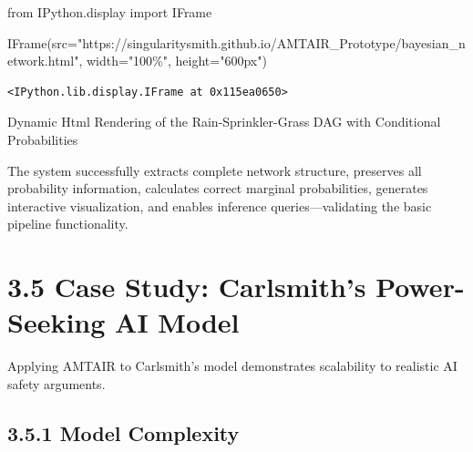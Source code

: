 \documentclass[
  11pt,
  letterpaper,
]{book}
\newenvironment{Shaded}{\begin{snugshade}}{\end{snugshade}}
\newcommand{\ImportTok}[1]{\textcolor[rgb]{0.00,0.46,0.62}{#1}}
\newcommand{\NormalTok}[1]{\textcolor[rgb]{0.00,0.23,0.31}{#1}}
\newcommand{\OperatorTok}[1]{\textcolor[rgb]{0.37,0.37,0.37}{#1}}
\newcommand{\StringTok}[1]{\textcolor[rgb]{0.13,0.47,0.30}{#1}}
\begin{document}
\begin{Shaded}
\begin{Highlighting}[]
\ImportTok{from}\NormalTok{ IPython.display }\ImportTok{import}\NormalTok{ IFrame}

\NormalTok{IFrame(src}\OperatorTok{=}\StringTok{"https://singularitysmith.github.io/AMTAIR\_Prototype/bayesian\_network.html"}\NormalTok{, width}\OperatorTok{=}\StringTok{"100\%"}\NormalTok{, height}\OperatorTok{=}\StringTok{"600px"}\NormalTok{)}
\end{Highlighting}
\end{Shaded}

\label{rain_sprinkler_grass_example_network_rendering2}
\begin{verbatim}
<IPython.lib.display.IFrame at 0x115ea0650>
\end{verbatim}

Dynamic Html Rendering of the Rain-Sprinkler-Grass DAG with Conditional
Probabilities

\begin{tcolorbox}[enhanced jigsaw, opacitybacktitle=0.6, colbacktitle=quarto-callout-tip-color!10!white, toptitle=1mm, colback=white, breakable, left=2mm, bottomrule=.15mm, title=\textcolor{quarto-callout-tip-color}{\faLightbulb}\hspace{0.5em}{Validation Success}, rightrule=.15mm, arc=.35mm, toprule=.15mm, opacityback=0, colframe=quarto-callout-tip-color-frame, bottomtitle=1mm, titlerule=0mm, leftrule=.75mm, coltitle=black]

The system successfully extracts complete network structure, preserves
all probability information, calculates correct marginal probabilities,
generates interactive visualization, and enables inference
queries---validating the basic pipeline functionality.

\end{tcolorbox}

\section*{3.5 Case Study: Carlsmith's Power-Seeking AI
Model}\label{sec-case-carlsmith}


Applying AMTAIR to Carlsmith's model demonstrates scalability to
realistic AI safety arguments.

\subsection*{3.5.1 Model Complexity}\label{sec-carlsmith-complexity}
\end{document}
